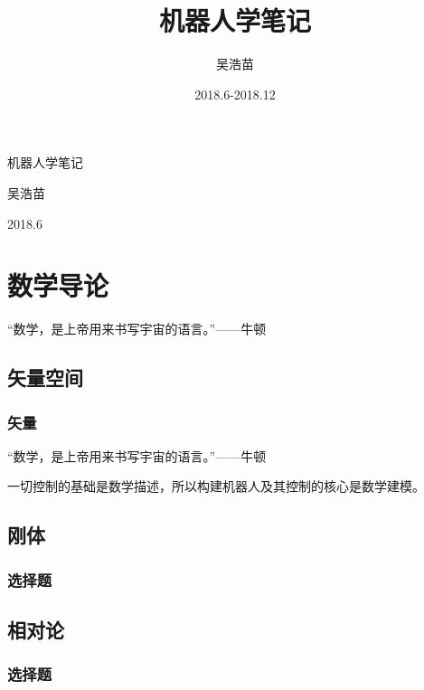 \documentclass[a4paper,zihao=5,openany,oneside,sub4section]{ctexbook}
\begin{document}
\title{机器人学笔记}
\author{吴浩苗}
\date{2018.6-2018.12}

\frontmatter
\thispagestyle{empty} %
\begin{titlepage}
	\centering
	\begin{center}
		\vspace*{6cm}
		{\par \Huge {\heiti 机器人学笔记 } }
		\vspace{1cm}
		{\par \LARGE {\lishu  吴浩苗} }
		\vspace{12cm}
        {\par \large 2018.6}
	\end{center}
\end{titlepage}
\afterpage{\nopagecolor}

\setcounter{page}{1}
\tableofcontents			%

\mainmatter %

\setcounter{page}{1}
\part{数学导论}
\cleardoublepage
“数学，是上帝用来书写宇宙的语言。”——牛顿
	\chapter{ {\heiti 矢量空间}  }
		\section{矢量}
“数学，是上帝用来书写宇宙的语言。”——牛顿
{\par 一切控制的基础是数学描述，所以构建机器人及其控制的核心是数学建模。}
	\chapter{刚体}
		\section{选择题}
	\chapter{相对论}
		\section{选择题}
\end{document}
